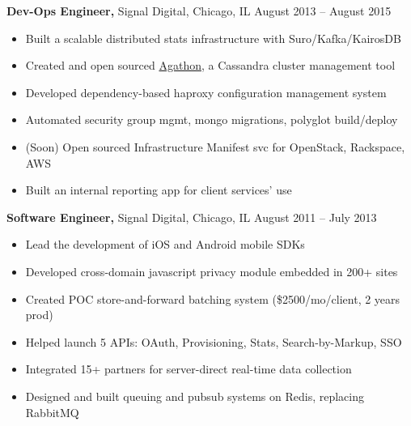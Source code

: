 \documentclass[margin]{res}
\begin{document}
\begin{resume}
{\bf Dev-Ops Engineer,} Signal Digital, Chicago, IL \hfill August 2013 -- August 2015
\begin{itemize} \itemsep -2pt  %
  \item Built a scalable distributed stats infrastructure with Suro/Kafka/KairosDB
  \item Created and open sourced \href{https://github.com/brighttag/agathon}{Agathon}, a Cassandra cluster management tool
  \item Developed dependency-based haproxy configuration management system
  \item Automated security group mgmt, mongo migrations, polyglot build/deploy
  \item (Soon) Open sourced Infrastructure Manifest svc for OpenStack, Rackspace, AWS
  \item Built an internal reporting app for client services' use
 \end{itemize}

 {\bf Software Engineer,} Signal Digital, Chicago, IL \hfill August 2011 -- July 2013
 \begin{itemize} \itemsep -2pt  %
  \item Lead the development of iOS and Android mobile SDKs
  \item Developed cross-domain javascript privacy module embedded in 200+ sites
  \item Created POC store-and-forward batching system (\$2500/mo/client, 2 years prod)
  \item Helped launch 5 APIs: OAuth, Provisioning, Stats, Search-by-Markup, SSO
  \item Integrated 15+ partners for server-direct real-time data collection
  \item Designed and built queuing and pubsub systems on Redis, replacing RabbitMQ
 \end{itemize}



\end{resume}
\end{document}
